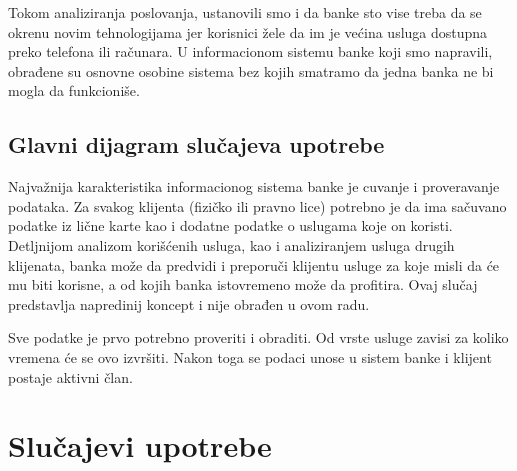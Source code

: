 \documentclass[a4paper]{article}
\begin{document}
Tokom analiziranja poslovanja, ustanovili smo i da banke sto vise treba da se okrenu novim tehnologijama jer korisnici žele 
da im je većina usluga dostupna preko telefona ili računara. U informacionom sistemu banke koji smo napravili, 
obrađene su osnovne osobine sistema  bez kojih smatramo da jedna banka ne bi mogla da funkcioniše.

\subsection{Glavni dijagram slučajeva upotrebe}

Najvažnija karakteristika informacionog sistema banke je cuvanje i proveravanje podataka. Za svakog klijenta (fizičko ili
pravno lice) potrebno je da ima sačuvano podatke iz lične karte kao i dodatne podatke o uslugama koje on koristi.
Detljnijom analizom korišćenih usluga, kao i analiziranjem usluga drugih klijenata, banka može da predvidi i preporuči
klijentu usluge za koje misli da će mu biti korisne, a od kojih banka istovremeno može da profitira. Ovaj slučaj
predstavlja napredinij koncept i nije obrađen u ovom radu.

Sve podatke je prvo potrebno proveriti i obraditi. Od vrste usluge zavisi za koliko vremena će se ovo izvršiti. 
Nakon toga se podaci unose u sistem banke i klijent postaje aktivni član.


\section{Slučajevi upotrebe}



\end{document}
